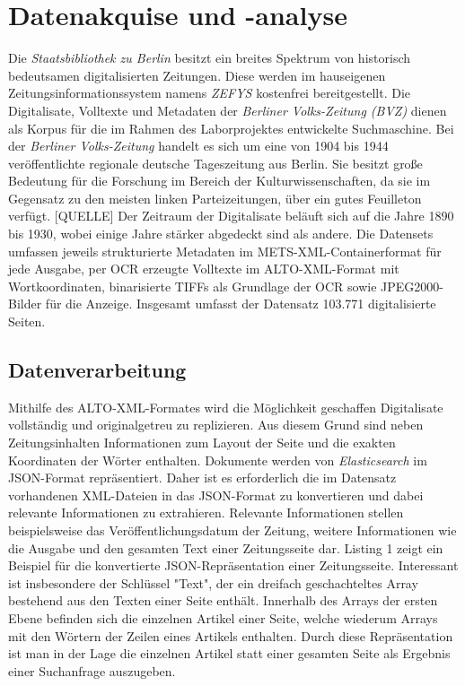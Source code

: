 \documentclass[11pt,a4paper, halfparskip]{scrartcl}
\begin{document}
\section{Datenakquise und -analyse}

Die \textit{Staatsbibliothek zu Berlin} besitzt ein breites Spektrum von historisch bedeutsamen digitalisierten Zeitungen.
Diese werden im hauseigenen Zeitungsinformationssystem namens \textit{ZEFYS} kostenfrei bereitgestellt.
Die Digitalisate, Volltexte und Metadaten der \textit{Berliner Volks-Zeitung (BVZ)} dienen als Korpus für die im Rahmen des Laborprojektes entwickelte Suchmaschine.
Bei der \textit{Berliner Volks-Zeitung} handelt es sich um eine von 1904 bis 1944 veröffentlichte regionale deutsche Tageszeitung aus Berlin.
Sie besitzt große Bedeutung für die Forschung im Bereich der Kulturwissenschaften, da sie im Gegensatz zu den meisten linken Parteizeitungen, über ein gutes Feuilleton verfügt. [QUELLE]
Der Zeitraum der Digitalisate beläuft sich auf die Jahre 1890 bis 1930, wobei einige Jahre stärker abgedeckt sind als andere.
Die Datensets umfassen jeweils strukturierte Metadaten im METS-XML-Containerformat für jede Ausgabe, per OCR erzeugte Volltexte im ALTO-XML-Format mit Wortkoordinaten, binarisierte TIFFs als Grundlage der OCR sowie JPEG2000-Bilder für die Anzeige.
Insgesamt umfasst der Datensatz 103.771 digitalisierte Seiten.

\subsection{Datenverarbeitung}

Mithilfe des ALTO-XML-Formates wird die Möglichkeit geschaffen Digitalisate vollständig und originalgetreu zu replizieren. 
Aus diesem Grund sind neben Zeitungsinhalten Informationen zum Layout der Seite und die exakten Koordinaten der Wörter enthalten.
Dokumente werden von \textit{Elasticsearch} im JSON-Format repräsentiert.
Daher ist es erforderlich die im Datensatz vorhandenen XML-Dateien in das JSON-Format zu konvertieren und dabei relevante Informationen zu extrahieren.
Relevante Informationen stellen beispielsweise das Veröffentlichungsdatum der Zeitung, weitere Informationen wie die Ausgabe und den gesamten Text einer Zeitungsseite dar.
Listing 1 zeigt ein Beispiel für die konvertierte JSON-Repräsentation einer Zeitungsseite.
Interessant ist insbesondere der Schlüssel "Text", der ein dreifach geschachteltes Array bestehend aus den Texten einer Seite enthält.
Innerhalb des Arrays der ersten Ebene befinden sich die einzelnen Artikel einer Seite, welche wiederum Arrays mit den Wörtern der Zeilen eines Artikels enthalten.
Durch diese Repräsentation ist man in der Lage die einzelnen Artikel statt einer gesamten Seite als Ergebnis einer Suchanfrage auszugeben.
\end{document}
